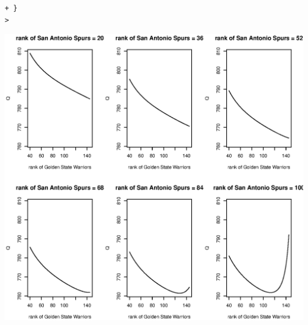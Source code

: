 \documentclass[11pt]{report}
\theoremstyle{definition}
\theoremstyle{remark}
\begin{document}
\begin{enumerate}
\begin{enumerate}
\begin{verbatim}
+ }
> \end{verbatim}
   \includegraphics[width=\textwidth]{a2_profile.eps}
    \end{enumerate}

\end{enumerate}
\end{document}
